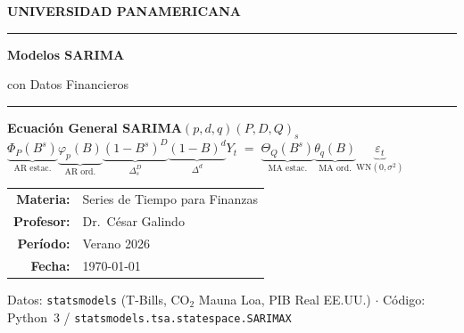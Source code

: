\documentclass[11pt, a4paper]{article}
\newcommand{\WN}{\mathrm{WN}}
\begin{document}
\begin{titlepage}
\centering\vspace*{1.5cm}
{\Large\bfseries\color{navy} UNIVERSIDAD PANAMERICANA\par}
\vspace{0.2cm}{\normalsize Facultad de Ciencias Empresariales\par}
\vspace{1.2cm}\textcolor{navy}{\rule{\linewidth}{2pt}}\vspace{0.4cm}
{\Huge\bfseries\color{navy} Modelos \textcolor{rojo}{SARIMA}\par
  con Datos Financieros\par}
\vspace{0.3cm}{\large Forma General, Interpretaci\'on y Tres Ejemplos en Python\par}
\vspace{0.4cm}\textcolor{navy}{\rule{\linewidth}{2pt}}\vspace{1.2cm}
\begin{tcolorbox}[formula, width=0.94\linewidth]
\centering\textbf{Ecuaci\'on General SARIMA$(p,d,q)(P,D,Q)_s$}\\[8pt]
\large
$\underbrace{\Phi_P(B^s)}_{\text{AR estac.}}
 \underbrace{\varphi_p(B)}_{\text{AR ord.}}
 \underbrace{(1-B^s)^D}_{\Delta_s^D}
 \underbrace{(1-B)^d}_{\Delta^d}
 Y_t
 \;=\;
 \underbrace{\Theta_Q(B^s)}_{\text{MA estac.}}
 \underbrace{\theta_q(B)}_{\text{MA ord.}}
 \underbrace{\varepsilon_t}_{\WN(0,\sigma^2)}$
\end{tcolorbox}
\vspace{1.5cm}
\begin{tabular}{rl}
  \textbf{Materia:}   & Series de Tiempo para Finanzas \\[4pt]
  \textbf{Profesor:}  & Dr.\ C\'esar Galindo \\[4pt]
  \textbf{Per\'iodo:} & Verano 2026 \\[4pt]
  \textbf{Fecha:}     & \today \\
\end{tabular}
\vfill
{\small\color{gray}
 Datos: \texttt{statsmodels} (T-Bills, CO$_2$ Mauna Loa, PIB Real EE.UU.) $\cdot$
 C\'odigo: Python~3 / \texttt{statsmodels.tsa.statespace.SARIMAX}}
\end{titlepage}

\tableofcontents\newpage

\end{document}
